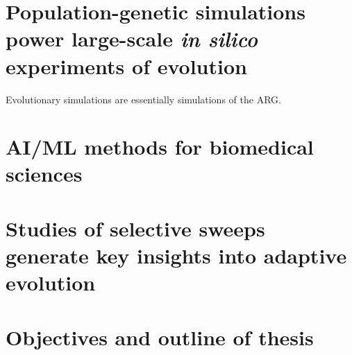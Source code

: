 \section{Population-genetic simulations power large-scale \textit{in silico} experiments of evolution} \label{intro-sim}


Evolutionary simulations are essentially simulations of the \ac{ARG}.




\section{\ac{AI}/\ac{ML} methods for biomedical sciences}

\section{Studies of selective sweeps generate key insights into adaptive evolution}

\section{Objectives and outline of thesis}
